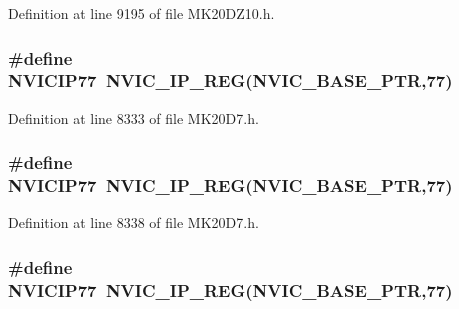 Definition at line 9195 of file M\+K20\+D\+Z10.\+h.

\subsubsection[{\texorpdfstring{N\+V\+I\+C\+I\+P77}{NVICIP77}}]{\setlength{\rightskip}{0pt plus 5cm}\#define N\+V\+I\+C\+I\+P77~{\bf N\+V\+I\+C\+\_\+\+I\+P\+\_\+\+R\+EG}({\bf N\+V\+I\+C\+\_\+\+B\+A\+S\+E\+\_\+\+P\+TR},77)}\hypertarget{group___n_v_i_c___register___accessor___macros_ga0fe50dde70295f1532c4299de160ba32}{}\label{group___n_v_i_c___register___accessor___macros_ga0fe50dde70295f1532c4299de160ba32}


Definition at line 8333 of file M\+K20\+D7.\+h.

\subsubsection[{\texorpdfstring{N\+V\+I\+C\+I\+P77}{NVICIP77}}]{\setlength{\rightskip}{0pt plus 5cm}\#define N\+V\+I\+C\+I\+P77~{\bf N\+V\+I\+C\+\_\+\+I\+P\+\_\+\+R\+EG}({\bf N\+V\+I\+C\+\_\+\+B\+A\+S\+E\+\_\+\+P\+TR},77)}\hypertarget{group___n_v_i_c___register___accessor___macros_ga0fe50dde70295f1532c4299de160ba32}{}\label{group___n_v_i_c___register___accessor___macros_ga0fe50dde70295f1532c4299de160ba32}


Definition at line 8338 of file M\+K20\+D7.\+h.

\subsubsection[{\texorpdfstring{N\+V\+I\+C\+I\+P77}{NVICIP77}}]{\setlength{\rightskip}{0pt plus 5cm}\#define N\+V\+I\+C\+I\+P77~{\bf N\+V\+I\+C\+\_\+\+I\+P\+\_\+\+R\+EG}({\bf N\+V\+I\+C\+\_\+\+B\+A\+S\+E\+\_\+\+P\+TR},77)}\hypertarget{group___n_v_i_c___register___accessor___macros_ga0fe50dde70295f1532c4299de160ba32}{}\label{group___n_v_i_c___register___accessor___macros_ga0fe50dde70295f1532c4299de160ba32}


